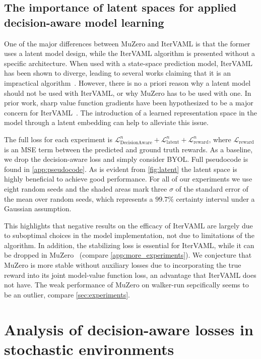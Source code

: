 \subsection{The importance of latent spaces for applied decision-aware model learning} \label{sec:representations}


One of the major differences between MuZero and IterVAML is that the former uses a latent model design, while the IterVAML algorithm is presented without a specific architecture.
When used with a state-space prediction model, IterVAML has been shown to diverge, leading to several works claiming that it is an impractical algorithm~\parencite{lovatto2020decision,voelcker2022value}.
However, there is no a priori reason why a latent model should not be used with IterVAML, or why MuZero has to be used with one.
In prior work, sharp value function gradients have been hypothesized to be a major concern for IterVAML~\parencite{voelcker2022value}.
The introduction of a learned representation space in the model through a latent embedding can help to alleviate this issue.

The full loss for each experiment is $\mathcal{L}^n_\text{DecisionAware} + \mathcal{L}^n_\text{latent} + \mathcal{L}^n_\text{reward}$, where $\mathcal{L}_\text{reward}$ is an MSE term between the predicted and ground truth rewards.
As a baseline, we drop the decision-aware loss and simply consider BYOL.
Full pseudocode is found in \autoref{app:pseudocode}.
As is evident from \autoref{fig:latent} the latent space is highly beneficial to achieve good performance.
For all of our experiments we use eight random seeds and the shaded areas mark three $\sigma$ of the standard error of the mean over random seeds, which represents a $99.7\%$ certainty interval under a Gaussian assumption.


This highlights that negative results on the efficacy of IterVAML are largely due to suboptimal choices in the model implementation, not due to limitations of the algorithm.
In addition, the stabilizing loss is essential for IterVAML, while it can be dropped in MuZero~\parencite{ye2021mastering} (compare \autoref{app:more_experiments}).
We conjecture that MuZero is more stable without auxiliary losses due to incorporating the true reward into its joint model-value function loss, an advantage that IterVAML does not have.
The weak performance of MuZero on walker-run sepcifically seems to be an outlier, compare \autoref{sec:experiments}.


\section{Analysis of decision-aware losses in stochastic environments}
\label{sec:theory}

